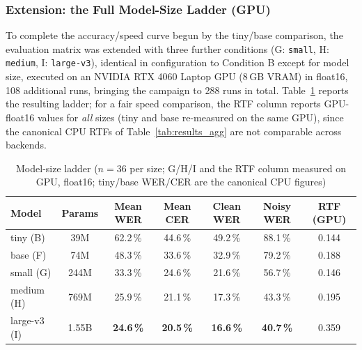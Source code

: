 \documentclass[12pt]{report}
\begin{document}
\subsubsection*{Extension: the Full Model-Size Ladder (GPU)}
To complete the accuracy/speed curve begun by the tiny/base comparison, the evaluation matrix was extended with three further conditions (G: \texttt{small}, H: \texttt{medium}, I: \texttt{large-v3}), identical in configuration to Condition B except for model size, executed on an NVIDIA RTX 4060 Laptop GPU (8\,GB VRAM) in float16, 108 additional runs, bringing the campaign to 288 runs in total. Table~\ref{tab:ladder} reports the resulting ladder; for a fair speed comparison, the RTF column reports GPU-float16 values for \emph{all} sizes (tiny and base re-measured on the same GPU), since the canonical CPU RTFs of Table~\ref{tab:results_agg} are not comparable across backends.
\begin{table}[H]
\centering
\small
\begin{tabular}{|l|c|c|c|c|c|c|}
\hline
\textbf{Model} & \textbf{Params} & \textbf{Mean WER} & \textbf{Mean CER} & \textbf{Clean WER} & \textbf{Noisy WER} & \textbf{RTF (GPU)} \\ \hline
tiny (B) & 39M & 62.2\,\% & 44.6\,\% & 49.2\,\% & 88.1\,\% & 0.144 \\ \hline
base (F) & 74M & 48.3\,\% & 33.6\,\% & 32.9\,\% & 79.2\,\% & 0.188 \\ \hline
small (G) & 244M & 33.3\,\% & 24.6\,\% & 21.6\,\% & 56.7\,\% & 0.146 \\ \hline
medium (H) & 769M & 25.9\,\% & 21.1\,\% & 17.3\,\% & 43.3\,\% & 0.195 \\ \hline
large-v3 (I) & 1.55B & \textbf{24.6\,\%} & \textbf{20.5\,\%} & \textbf{16.6\,\%} & \textbf{40.7\,\%} & 0.359 \\ \hline
\end{tabular}
\caption{Model-size ladder ($n=36$ per size; G/H/I and the RTF column measured on GPU, float16; tiny/base WER/CER are the canonical CPU figures)}
\label{tab:ladder}
\end{table}
\end{document}

